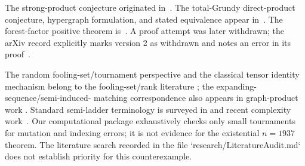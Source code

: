 \documentclass[11pt]{article}
\begin{document}
The strong-product conjecture originated in~\cite{bresar2016}.  The
total-Grundy direct-product conjecture, hypergraph formulation, and stated
equivalence appear in~\cite{bresar2018,bresar2018doi}.  The forest-factor
positive theorem is~\cite{bell2021}.  A proof attempt was later withdrawn;
the arXiv record explicitly marks version 2 as withdrawn and notes an error
in its proof~\cite{herrman2023}.

The random fooling-set/tournament perspective and the classical tensor
identity mechanism belong to the fooling-set/rank literature
\cite{pourmoradnasseri2016,friesen2014}; the expanding-sequence/semi-induced-
matching correspondence also appears in graph-product work
\cite{chalermsook2013}.  Standard semi-ladder terminology is surveyed in
\cite{fabianski2019} and recent complexity work~\cite{manurangsi2026}.
Our computational package exhaustively checks only small tournaments for
mutation and indexing errors; it is not evidence for the existential
$n=1937$ theorem.  The literature search recorded in
the file `research/LiteratureAudit.md` does not establish priority for this
counterexample.



\end{document}
